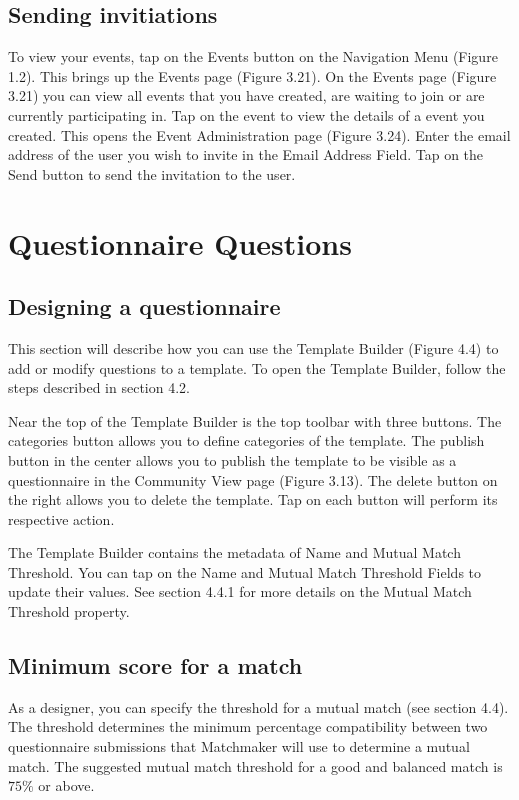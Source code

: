 \subsection{Sending invitiations}
\label{sec:questionnaire-invite}
To view your events, tap on the Events button on the Navigation Menu (Figure 1.2). This brings up the Events page (Figure 3.21).   On the Events page (Figure 3.21) you can view all events that you have created, are waiting to join or are currently participating in.  Tap on the event to view the details of a event you created.  This opens the Event Administration page (Figure 3.24).   Enter the email address of the user you wish to invite in the Email Address Field.  Tap on the Send button to send the invitation to the user.

\clearpage
\section{Questionnaire Questions}
\label{sec:qquestions}

\subsection{Designing a questionnaire}
\label{sec:dquestions}

This section will describe how you can use the Template Builder (Figure 4.4) to add or modify questions to a template. To open the Template Builder, follow the steps described in section 4.2. 

Near the top of the Template Builder is the top toolbar with three buttons. The categories button    allows you to define categories of the template. The publish button   in the center allows you to publish the template to be visible as a questionnaire in the Community View page (Figure 3.13). The delete button   on the right allows you to delete the template.  Tap on each button will perform its respective action. 

The Template Builder contains the metadata of Name and Mutual Match Threshold. You can tap on the Name and Mutual Match Threshold Fields to update their values.  See section 4.4.1 for more details on the Mutual Match Threshold property.

\subsection{Minimum score for a match}
\label{sec:minscore}
As a designer, you can specify the threshold for a mutual match (see section 4.4). The threshold determines the minimum percentage compatibility between two questionnaire submissions that Matchmaker will use to determine a mutual match.  The suggested mutual match threshold for a good and balanced match is $75\%$ or above.

